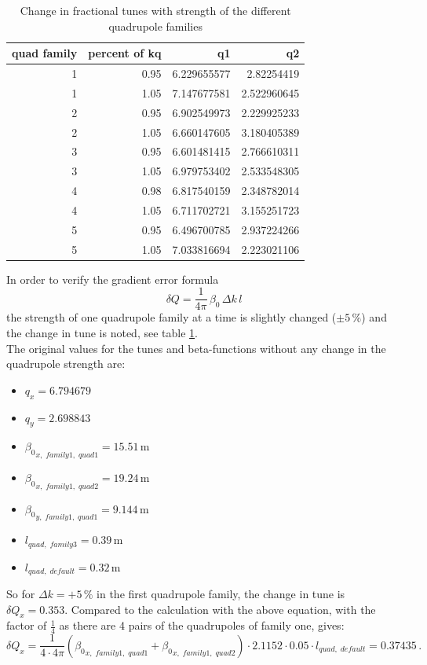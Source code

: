 \begin{table}[tbp]
    \centering
    \small
    \begin{tabular}{r|r r r}
quad family&percent of kq&q1& q2\\\hline
1& 0.95&6.229655577& 2.82254419\\
1&1.05&7.147677581&2.522960645\\
2& 0.95&6.902549973&2.229925233\\
2&1.05&6.660147605&3.180405389\\
3&0.95&6.601481415&2.766610311\\
3&1.05&6.979753402&2.533548305\\
4&0.98&6.817540159&2.348782014\\
4&1.05&6.711702721&3.155251723\\
5&0.95&6.496700785&2.937224266\\
5&1.05&7.033816694&2.223021106
    \end{tabular}
    \caption{Change in fractional tunes with strength of the different quadrupole families}
    \label{tab:3d}
\end{table}
In order to verify the gradient error formula
$$\delta Q=\frac{1}{4\pi}\,\beta_0\,\Delta k\,l$$
the strength of one quadrupole family at a time is slightly changed ($\pm5\,\%$) and the change in tune is noted, see table \ref{tab:3d}.\\
The original values for the tunes and beta-functions without any change in the quadrupole strength are:
\begin{itemize}
    \item $q_x=6.794679$
    \item $q_y=2.698843$
    \item ${\beta_0}_{x,\;family1,\;quad1}=15.51\,\mathrm{m}$
    \item ${\beta_0}_{x,\;family1,\;quad2}=19.24\,\mathrm{m}$
    \item ${\beta_0}_{y,\;family1,\;quad1}=9.144\,\mathrm{m}$
    \item $l_{quad,\;family3}=0.39\,\mathrm{m}$
    \item $l_{quad,\;default}=0.32\,\mathrm{m}$
\end{itemize}
So for $\Delta k=+5\,\%$ in the first quadrupole family, the change in tune is $\delta Q_x=0.353$.
Compared to the calculation with the above equation, with the factor of $\frac{1}{4}$ as there are 4 pairs of the quadrupoles of family one, gives:
$$\delta Q_x=\frac{1}{4\cdot4\pi}({\beta_0}_{x,\;family1,\;quad1}+{\beta_0}_{x,\;family1,\;quad2})\cdot 2.1152 \cdot0.05\cdot l_{quad,\;default}=0.37435\,.$$
